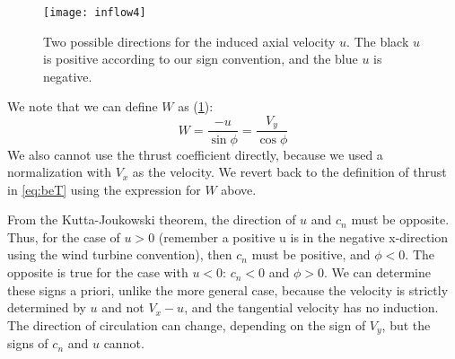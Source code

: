 \begin{figure}[htbp]
    \centering
    \texttt{[image: inflow4]}
    \caption{Two possible directions for the induced axial velocity $u$.  The black $u$ is positive according to our sign convention, and the blue $u$ is negative.}
    \label{fig:inflowu}
\end{figure}

We note that we can define $W$ as (\cref{fig:inflowu}):
\begin{equation}
    W = \frac{-u}{\sin\phi} = \frac{V_y}{\cos\phi}
\end{equation}
We also cannot use the thrust coefficient directly, because we used a normalization with $V_x$ as the velocity.  We revert back to the definition of thrust in \cref{eq:beT} using the expression for $W$ above.

From the Kutta-Joukowski theorem, the direction of $u$ and $c_n$ must be opposite.  Thus, for the case of $u > 0$ (remember a positive u is in the negative x-direction using the wind turbine convention), then $c_n$ must be positive, and $\phi < 0$.  The opposite is true for the case with $u < 0$: $c_n < 0$ and $\phi > 0$.  We can determine these signs a priori, unlike the more general case, because the velocity is strictly determined by $u$ and not $V_x - u$, and the tangential velocity has no induction.  The direction of circulation can change, depending on the sign of $V_y$, but the signs of $c_n$ and $u$ cannot.




